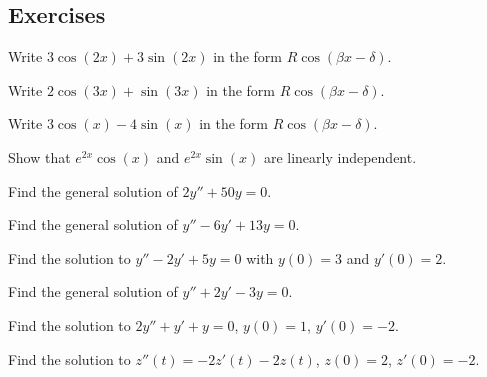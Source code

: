 \subsection{Exercises}

\begin{exercise}\ansMark%
Write $3 \cos(2x) + 3\sin(2x)$ in the form $R \cos(\beta x - \delta)$.
\end{exercise}
%

\begin{exercise}
Write $2 \cos(3x) + \sin(3x)$ in the form $R \cos(\beta x - \delta)$.
\end{exercise}

\begin{exercise}
Write $3 \cos(x) - 4\sin(x)$ in the form $R \cos(\beta x - \delta)$.
\end{exercise}

\begin{exercise}
Show that $e^{2x}\cos(x)$ and $e^{2x}\sin(x)$ are linearly independent.
\end{exercise}

\begin{exercise}
Find the general solution of $2y'' + 50y = 0$.
\end{exercise}

\begin{exercise}
Find the general solution of $y'' - 6 y' + 13 y = 0$.
\end{exercise}

\begin{exercise}
Find the solution to $y'' - 2y' + 5y = 0$ with $y(0) = 3$ and $y'(0) = 2$. 
\end{exercise} 

\begin{exercise}
Find the general solution of $y'' + 2y' - 3y = 0$.
\end{exercise}

\begin{exercise}\ansMark%
Find the solution to
$2y''+y'+y=0$, $y(0) = 1$, $y'(0)=-2$.
\end{exercise}

\begin{exercise}\ansMark%
Find the solution to
$z''(t) = -2z'(t)-2z(t)$, $z(0) = 2$, $z'(0)= -2$.
\end{exercise}



